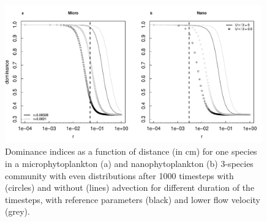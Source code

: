 \documentclass[english]{article}
\begin{document}
\begin{figure}[H]
\begin{centering}
\includegraphics[width=0.99\textwidth]{../code/figure/theoretical_dominance_with_adv}
\par\end{centering}
\caption{Dominance indices as a function of distance (in cm) for one species
in a microphytoplankton (a) and nanophytoplankton (b) 3-species community
with even distributions after 1000 timesteps with (circles) and without
(lines) advection for different duration of the timesteps, with reference
parameters (black) and lower flow velocity (grey). \label{fig:Dominance_advection}}

\end{figure}



\end{document}
